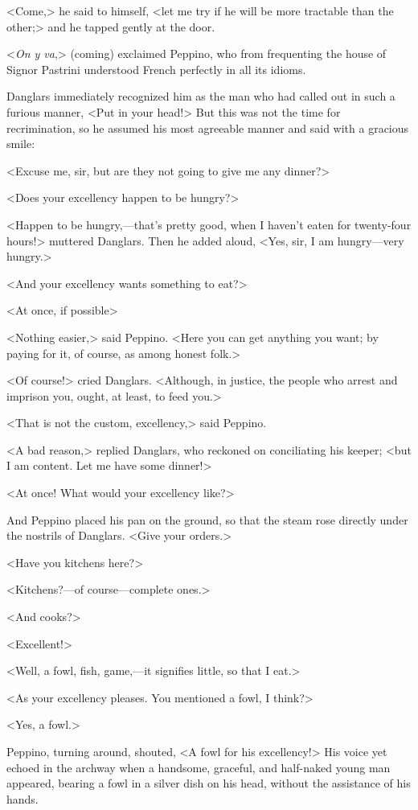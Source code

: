  <Come,> he said to himself, <let me try if he will be more tractable than the other;> and he tapped gently at the door. 

 <\textit{On y va},> (coming) exclaimed Peppino, who from frequenting the house of Signor Pastrini understood French perfectly in all its idioms. 

 Danglars immediately recognized him as the man who had called out in such a furious manner, <Put in your head!> But this was not the time for recrimination, so he assumed his most agreeable manner and said with a gracious smile: 

 <Excuse me, sir, but are they not going to give me any dinner?> 

 <Does your excellency happen to be hungry?> 

 <Happen to be hungry,—that's pretty good, when I haven't eaten for twenty-four hours!> muttered Danglars. Then he added aloud, <Yes, sir, I am hungry—very hungry.> 

 <And your excellency wants something to eat?> 

 <At once, if possible> 

 <Nothing easier,> said Peppino. <Here you can get anything you want; by paying for it, of course, as among honest folk.> 

 <Of course!> cried Danglars. <Although, in justice, the people who arrest and imprison you, ought, at least, to feed you.> 

 <That is not the custom, excellency,> said Peppino. 

 <A bad reason,> replied Danglars, who reckoned on conciliating his keeper; <but I am content. Let me have some dinner!> 

 <At once! What would your excellency like?> 

 And Peppino placed his pan on the ground, so that the steam rose directly under the nostrils of Danglars. <Give your orders.> 

 <Have you kitchens here?> 

 <Kitchens?—of course—complete ones.> 

 <And cooks?> 

 <Excellent!> 

 <Well, a fowl, fish, game,—it signifies little, so that I eat.> 

 <As your excellency pleases. You mentioned a fowl, I think?> 

 <Yes, a fowl.> 

 Peppino, turning around, shouted, <A fowl for his excellency!> His voice yet echoed in the archway when a handsome, graceful, and half-naked young man appeared, bearing a fowl in a silver dish on his head, without the assistance of his hands. 

